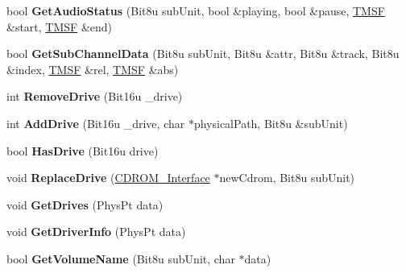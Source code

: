 \begin{DoxyCompactItemize}
\item 
\hypertarget{classCMscdex_a6d7888d1040575a0a0a42050349474fe}{bool {\bfseries Get\-Audio\-Status} (Bit8u sub\-Unit, bool \&playing, bool \&pause, \hyperlink{structSMSF}{T\-M\-S\-F} \&start, \hyperlink{structSMSF}{T\-M\-S\-F} \&end)}\label{classCMscdex_a6d7888d1040575a0a0a42050349474fe}

\item 
\hypertarget{classCMscdex_acc843b37e0b19afd37b166f765f7da44}{bool {\bfseries Get\-Sub\-Channel\-Data} (Bit8u sub\-Unit, Bit8u \&attr, Bit8u \&track, Bit8u \&index, \hyperlink{structSMSF}{T\-M\-S\-F} \&rel, \hyperlink{structSMSF}{T\-M\-S\-F} \&abs)}\label{classCMscdex_acc843b37e0b19afd37b166f765f7da44}

\item 
\hypertarget{classCMscdex_ac4ec6dc6be27ecfb68a5e1260dd9887b}{int {\bfseries Remove\-Drive} (Bit16u \-\_\-drive)}\label{classCMscdex_ac4ec6dc6be27ecfb68a5e1260dd9887b}

\item 
\hypertarget{classCMscdex_a7b9b06adbd55c99acd20a49d6ea67941}{int {\bfseries Add\-Drive} (Bit16u \-\_\-drive, char $\ast$physical\-Path, Bit8u \&sub\-Unit)}\label{classCMscdex_a7b9b06adbd55c99acd20a49d6ea67941}

\item 
\hypertarget{classCMscdex_af0edfe20ac94f225b50f78ce6b3ba7ac}{bool {\bfseries Has\-Drive} (Bit16u drive)}\label{classCMscdex_af0edfe20ac94f225b50f78ce6b3ba7ac}

\item 
\hypertarget{classCMscdex_af8e409575d47ef937b29cb448f4488d7}{void {\bfseries Replace\-Drive} (\hyperlink{classCDROM__Interface}{C\-D\-R\-O\-M\-\_\-\-Interface} $\ast$new\-Cdrom, Bit8u sub\-Unit)}\label{classCMscdex_af8e409575d47ef937b29cb448f4488d7}

\item 
\hypertarget{classCMscdex_af22f4c89b95a722c9b0f767724ce06dd}{void {\bfseries Get\-Drives} (Phys\-Pt data)}\label{classCMscdex_af22f4c89b95a722c9b0f767724ce06dd}

\item 
\hypertarget{classCMscdex_a330841e5a31e66bc7776306caedb6819}{void {\bfseries Get\-Driver\-Info} (Phys\-Pt data)}\label{classCMscdex_a330841e5a31e66bc7776306caedb6819}

\item 
\hypertarget{classCMscdex_a63eb50fe387c54c91ee7dac321836361}{bool {\bfseries Get\-Volume\-Name} (Bit8u sub\-Unit, char $\ast$data)}\label{classCMscdex_a63eb50fe387c54c91ee7dac321836361}


\end{DoxyCompactItemize}
